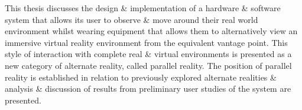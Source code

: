 This thesis discusses the design \& implementation of a hardware \& software system that allows its user to observe \& move around their real world environment whilst wearing equipment that allows them to alternatively view an immersive virtual reality environment from the equivalent vantage point. This style of interaction with complete real \& virtual environments is presented as a new category of alternate reality, called parallel reality. The position of parallel reality is established in relation to previously explored alternate realities \& analysis \& discussion of results from preliminary user studies of the system are presented.